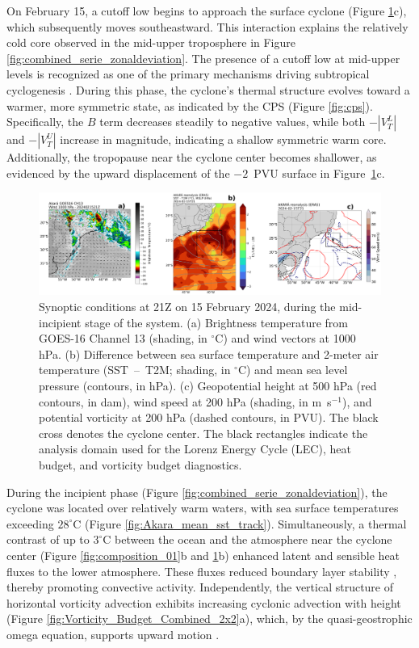 \documentclass[pdflatex,sn-chicago]{sn-jnl}%
\theoremstyle{plain}
\theoremstyle{definition}
\theoremstyle{remark}
\theoremstyle{definition}
\begin{document}
On February 15, a cutoff low begins to approach the surface cyclone (Figure \ref{fig:composition_02}c), which subsequently moves southeastward. This interaction explains the relatively cold core observed in the mid-upper troposphere in Figure \ref{fig:combined_serie_zonaldeviation}. The presence of a cutoff low at mid-upper levels is recognized as one of the primary mechanisms driving subtropical cyclogenesis \citep{da2019subtropical}. During this phase, the cyclone’s thermal structure evolves toward a warmer, more symmetric state, as indicated by the CPS (Figure \ref{fig:cps}). Specifically, the $B$ term decreases steadily to negative values, while both $-|V_T^L|$ and $-|V_T^U|$ increase in magnitude, indicating a shallow symmetric warm core.  Additionally, the tropopause near the cyclone center becomes shallower, as evidenced by the upward displacement of the $-2$~PVU surface in Figure~\ref{fig:composition_02}c.

\begin{figure}[h!]
\centering
\includegraphics[width=\textwidth]{composition_02.png}
\caption{Synoptic conditions at 21Z on 15 February 2024, during the mid-incipient stage of the system. (a) Brightness temperature from GOES-16 Channel 13 (shading, in $^{\circ}$C) and wind vectors at 1000 hPa. (b) Difference between sea surface temperature and 2-meter air temperature (SST~--~T2M; shading, in $^{\circ}$C) and mean sea level pressure (contours, in hPa). (c) Geopotential height at 500 hPa (red contours, in dam), wind speed at 200 hPa (shading, in m~s$^{-1}$), and potential vorticity at 200 hPa (dashed contours, in PVU). The black cross denotes the cyclone center. The black rectangles indicate the analysis domain used for the Lorenz Energy Cycle (LEC), heat budget, and vorticity budget diagnostics.}
\label{fig:composition_02}
\end{figure}

During the incipient phase (Figure \ref{fig:combined_serie_zonaldeviation}), the cyclone was located over relatively warm waters, with sea surface temperatures exceeding $28^{\circ}\text{C}$ (Figure \ref{fig:Akara_mean_sst_track}). Simultaneously, a thermal contrast of up to $3^{\circ}\text{C}$ between the ocean and the atmosphere near the cyclone center (Figure \ref{fig:composition_01}b and \ref{fig:composition_02}b) enhanced latent and sensible heat fluxes to the lower atmosphere. These fluxes reduced boundary layer stability \citep[e.g.,][]{pezzi2009multiyear,pezzi2021oceanic}, thereby promoting convective activity. Independently, the vertical structure of horizontal vorticity advection exhibits increasing cyclonic advection with height (Figure \ref{fig:Vorticity_Budget_Combined_2x2}a), which, by the quasi-geostrophic omega equation, supports upward motion \citep{trenberth1978interpretation,maddox1982examination}. 
\end{document}
